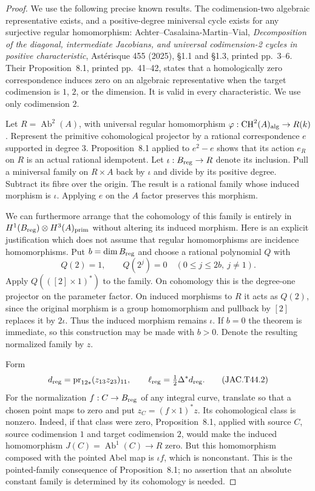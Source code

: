 \begin{proof}
We use the following precise known results. The codimension-two
algebraic representative exists, and a positive-degree miniversal
cycle exists for any surjective regular homomorphism:
Achter--Casalaina-Martin--Vial, \emph{Decomposition of the diagonal,
intermediate Jacobians, and universal codimension-2 cycles in positive
characteristic}, Ast\'erisque 455 (2025), \S1.1 and \S1.3, printed
pp.~3--6. Their Proposition~8.1, printed pp.~41--42, states that a
homologically zero correspondence induces zero on an algebraic
representative when the target codimension is $1$, $2$, or the
dimension. It is valid in every characteristic. We use only
codimension $2$.

Let $R=\operatorname{Ab}^2(A)$, with universal regular homomorphism
$\varphi:\operatorname{CH}^2(A)_{\rm alg}\to R(k)$.
Represent the primitive cohomological projector by a rational
correspondence $e$ supported in degree $3$. Proposition~8.1 applied
to $e^2-e$ shows that its action $e_R$ on $R$ is an actual rational
idempotent. Let $\iota:B_{\rm reg}\to R$ denote its inclusion.
Pull a miniversal family on $R\times A$ back by $\iota$ and divide
by its positive degree. Subtract its fibre over the origin. The
result is a rational family whose induced morphism is $\iota$.
Applying $e$ on the $A$ factor preserves this morphism.

We can furthermore arrange that the cohomology of this family is
entirely in $H^1(B_{\rm reg})\otimes H^3(A)_{\rm prim}$ without
altering its induced morphism. Here is an explicit justification
which does not assume that regular homomorphisms are incidence
homomorphisms. Put $b=\dim B_{\rm reg}$ and choose a rational
polynomial $Q$ with
\[
 Q(2)=1,\qquad Q(2^j)=0\quad(0\le j\le2b,\ j\ne1).
\]
Apply $Q(([2]\times1)^*)$ to the family. On cohomology this is the
degree-one projector on the parameter factor. On induced morphisms
to $R$ it acts as $Q(2)$, since the original morphism is a group
homomorphism and pullback by $[2]$ replaces it by $2\iota$.
Thus the induced morphism remains $\iota$. If $b=0$ the theorem is
immediate, so this construction may be made with $b>0$.
Denote the resulting normalized family by $z$.

Form
\[
 d_{\rm reg}=\operatorname{pr}_{12*}(z_{13}z_{23})_{11},
 \qquad \ell_{\rm reg}=\tfrac12\Delta^*d_{\rm reg}.
                                                        \tag{JAC.T44.2}
\]
For the normalization $f:C\to B_{\rm reg}$ of any integral curve,
translate so that a chosen point maps to zero and put
$z_C=(f\times1)^*z$. Its cohomological class is nonzero. Indeed,
if that class were zero, Proposition~8.1, applied with source $C$,
source codimension $1$ and target codimension $2$, would make the
induced homomorphism
$J(C)=\operatorname{Ab}^1(C)\to R$ zero. But this homomorphism
composed with the pointed Abel map is $\iota f$, which is
nonconstant. This is the pointed-family consequence of
Proposition~8.1; no assertion that an absolute constant family is
determined by its cohomology is needed.


\end{proof}
